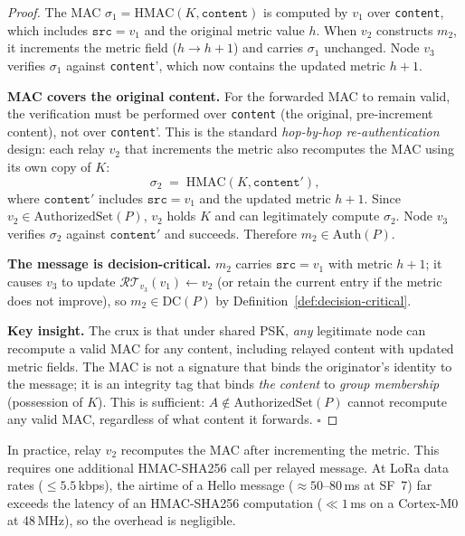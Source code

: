 \begin{proof}
The MAC $\sigma_1 = \mathrm{HMAC}(K, \texttt{content})$ is computed by
$v_1$ over \texttt{content}, which includes $\texttt{src}=v_1$ and the
original metric value $h$.
When $v_2$ constructs $m_2$, it increments the metric field
($h \to h+1$) and carries $\sigma_1$ unchanged.
Node $v_3$ verifies $\sigma_1$ against \texttt{content}', which now
contains the updated metric $h+1$.

\medskip
\noindent\textbf{MAC covers the original content.}\;
For the forwarded MAC to remain valid, the verification must be
performed over \texttt{content} (the original, pre-increment content),
not over \texttt{content}'.
This is the standard \emph{hop-by-hop re-authentication} design: each
relay $v_2$ that increments the metric also recomputes the MAC using its
own copy of $K$:
\[
  \sigma_2 \;=\; \mathrm{HMAC}(K, \texttt{content}'),
\]
where $\texttt{content}'$ includes $\texttt{src}=v_1$ and the updated
metric $h+1$.
Since $v_2 \in \mathrm{AuthorizedSet}(P)$, $v_2$ holds $K$ and can
legitimately compute $\sigma_2$.
Node $v_3$ verifies $\sigma_2$ against $\texttt{content}'$ and succeeds.
Therefore $m_2 \in \mathrm{Auth}(P)$.

\medskip
\noindent\textbf{The message is decision-critical.}\;
$m_2$ carries $\texttt{src}=v_1$ with metric $h+1$; it causes $v_3$ to
update $\mathcal{RT}_{v_3}(v_1) \leftarrow v_2$ (or retain the current
entry if the metric does not improve), so $m_2 \in \mathrm{DC}(P)$ by
Definition~\ref{def:decision-critical}.

\medskip
\noindent\textbf{Key insight.}\;
The crux is that under shared PSK, \emph{any} legitimate node can
recompute a valid MAC for any content, including relayed content with
updated metric fields.  The MAC is not a signature that binds the
originator's identity to the message; it is an integrity tag that binds
\emph{the content} to \emph{group membership} (possession of $K$).
This is sufficient: $A \notin \mathrm{AuthorizedSet}(P)$ cannot
recompute any valid MAC, regardless of what content it forwards.
\hfill$\square$
\end{proof}

\begin{remark}
\label{rem:reauth-impl}
In practice, relay $v_2$ recomputes the MAC after incrementing the
metric.  This requires one additional HMAC-SHA256 call per relayed
message.  At LoRa data rates ($\le 5.5$\,kbps), the airtime of a Hello
message ($\approx 50$--$80$\,ms at SF~7) far exceeds the latency of an
HMAC-SHA256 computation ($\ll 1$\,ms on a Cortex-M0 at 48\,MHz), so
the overhead is negligible.
\end{remark}

